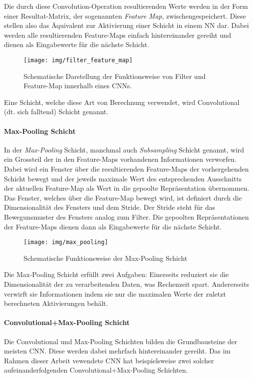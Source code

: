 Die durch diese Convolution-Operation resultierenden Werte werden in der Form einer Resultat-Matrix, der sogenannten \emph{Feature Map}, zwischengespeichert. Diese stellen also das Äquivalent zur Aktivierung einer Schicht in einem NN dar. Dabei werden alle resultierenden Feature-Maps einfach hintereinander gereiht und dienen als Eingabewerte für die nächste Schicht. 

\begin{figure}[h]
	\centering
	\texttt{[image: img/filter\_feature\_map]}
	\caption{Schematische Darstellung der Funktionsweise von Filter und Feature-Map innerhalb eines CNNs.\protect\footnotemark}
\end{figure}

Eine Schicht, welche diese Art von Berechnung verwendet, wird Convolutional (dt. sich falltend) Schicht genannt.

\paragraph{Max-Pooling Schicht} In der \emph{Max-Pooling} Schicht, manchmal auch \emph{Subsampling} Schicht genannt, wird ein Grossteil der in den Feature-Maps vorhandenen Informationen verworfen. Dabei wird ein Fenster über die resultierenden Feature-Maps der vorhergehenden Schicht bewegt und der jeweils maximale Wert des entsprechenden Ausschnitts der aktuellen Feature-Map als Wert in die gepoolte Repräsentation übernommen. Das Fenster, welches über die Feature-Map bewegt wird, ist definiert durch die Dimensionalität des Fensters und dem Stride. Der Stride steht für das Bewegunsmuster des Fensters analog zum Filter. Die gepoolten Repräsentationen der Feature-Maps dienen dann als Eingabewerte für die nächste Schicht.

\begin{figure}[H]
	\centering
	\texttt{[image: img/max\_pooling]}
	\caption{Schematische Funktionsweise der Max-Pooling Schicht}
\end{figure}

Die Max-Pooling Schicht erfüllt zwei Aufgaben: Einerseits reduziert sie die Dimensionalität der zu verarbeitenden Daten, was Rechenzeit spart. Andererseits verwirft sie  Informationen indem sie nur die maximalen Werte der zuletzt berechneten Aktivierungen behält.

\paragraph{Convolutional+Max-Pooling Schicht} Die Convolutional und Max-Pooling Schichten bilden die Grundbausteine der meisten CNN. Diese werden dabei mehrfach hintereinander gereiht. Das im Rahmen dieser Arbeit vewendete CNN hat beispielsweise zwei solcher aufeinanderfolgenden Convolutional+Max-Pooling Schichten.

